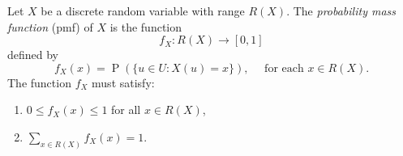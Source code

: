 \documentclass[11pt, headings=standardclasses, parskip=half, twoside]{scrartcl}
\begin{document}

\begin{definition}{}
    Let $X$ be a discrete random variable with range $R(X)$. The \textit{probability mass function} (pmf) of $X$ is the function
    \[
    f_{X}: R(X) \rightarrow[0,1]
    \]
    defined by
    \[
    f_{X}(x)=\operatorname{P}(\{u \in U: X(u)=x\}), \quad \text { for each } x \in R(X).
    \]
    The function $f_{X}$ must satisfy:  \begin{enumerate}
      \item $0 \leq f_{X}(x) \leq 1$ for all $x \in R(X)$,
      \item $\sum_{x \in R(X)} f_{X}(x)=1$. \qedhere
    \end{enumerate}
    \end{definition}
\end{document}
